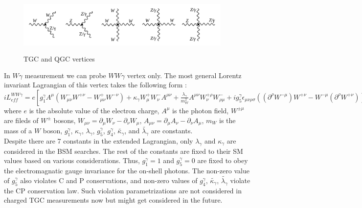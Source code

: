 

\begin{figure}[htb]
  \begin{center}
    {\includegraphics[width=0.95\textwidth]{../figs/WgAbout/TGC_and_QGC_vertices.png}}
    \caption{TGC and QGC vertices}
    \label{fig:TGC_and_QGC_vertices}
  \end{center}
\end{figure}


In $W\gamma$ measurement we can probe $WW\gamma$ vertex only. The most general Lorentz invariant Lagrangian of this vertex takes the following form \cite{ref_theory_aTGC}:\\

$i L_{eff}^{WW\gamma}= e [ g_1^{\gamma} A^\mu (W_{\mu\nu}^- W^{+\nu} - W_{\mu\nu}^+ W^{-\nu}) + \kappa_\gamma W_{\mu}^+ W_{\nu}^- A^{\mu\nu} + {\frac{\lambda_\gamma}{m^2_W}} A^{\mu\nu} W_\nu^{+\rho} W_{\rho\mu}^- + i g_5^\gamma \epsilon_{\mu\nu\rho\sigma}((\partial^\rho W^{-\mu})W^{+\nu} - W^{-\mu}(\partial^{\rho}W^{+\nu}))V^\sigma + i g_4^\gamma W_\mu^- W_\nu^+ (\partial^\mu A^\nu + \partial^\nu A^\mu) - \frac{\tilde{\kappa_\gamma}}{2} W_\mu^- W_\nu^+ \epsilon^{\mu\nu\rho\sigma} A_{\rho\sigma} - \frac{\tilde{\lambda_\gamma}}{2 m_W^2} W_{\rho\mu}^- W^{+\mu}_{\nu} \epsilon^{\nu\rho\alpha\beta} A_{\alpha\beta}] $\\

where $e$ is the absolute value of the electron charge, $A^\mu$ is the photon field, $W^{\pm\mu}$ are fileds of $W^\pm$ bosons, $W_{\mu\nu}=\partial_\mu W_\nu - \partial_\nu W_\mu$, $A_{\mu\nu}=\partial_\mu A_\nu - \partial_\nu A_\mu$, $m_W$ is the mass of a $W$ boson, $g_1^\gamma$, $\kappa_\gamma$, $\lambda_\gamma$, $g_5^\gamma$, $g_4^\gamma$, $\tilde{\kappa_\gamma}$, and $\tilde{\lambda_\gamma}$ are constants.\\

Despite there are 7 constants in the extended Lagrangian, only $\lambda_\gamma$ and $\kappa_\gamma$ are considered in the BSM searches. The rest of the constants are fixed to their SM values based on various considerations. Thus, $g_1^\gamma=1$ and $g_5^\gamma=0$ are fixed to obey the electromagnatic gauge invariance for the on-shell photons. The non-zero value of $g_5^\gamma$ also violates C and P conservations, and non-zero values of $g_4^\gamma$, $\tilde{\kappa_\gamma}$, $\tilde{\lambda_\gamma}$ violate the CP conservation law. Such violation parametrizations are not considered in charged TGC measurements now but might get considered in the future.\\

